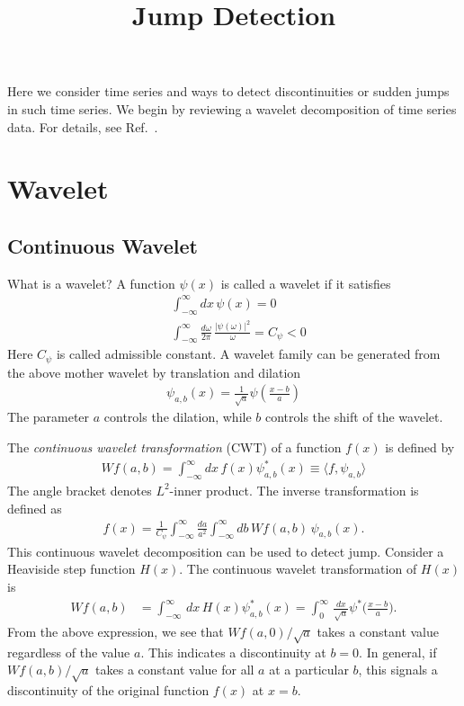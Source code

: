 \documentclass[11pt,a4paper]{article}
\begin{document}
\title{Jump Detection}
\maketitle

Here we consider time series and ways to detect discontinuities or sudden jumps in such time series. We begin by reviewing a wavelet decomposition of time series data. For details, see Ref.~\cite{1992tlw..conf.....D}.

\section{Wavelet}
\subsection{Continuous Wavelet}
What is a wavelet? A function $\psi(x)$ is called a wavelet if it satisfies
\begin{align}
&
\int_{-\infty}^{\infty} dx \, \psi(x)  = 0
\\
&
\int_{-\infty}^{\infty} \frac{d\omega}{2\pi} \, \frac{|\psi(\omega)|^2}{\omega} = C_\psi < 0
\end{align}
Here $C_\psi$ is called admissible constant. A wavelet family can be generated from the above mother wavelet by translation and dilation
\begin{align}
\psi_{a,b}(x) 
= \frac{1}{\sqrt{a}} \psi \left( \frac{x - b}{a} \right)
\end{align}
The parameter $a$ controls the dilation, while $b$ controls the shift of the wavelet. 

The {\it continuous wavelet transformation} (CWT) of a function $f(x)$ is defined by
\begin{align}
W f(a,b) = \int_{-\infty}^\infty dx \,  f(x) \psi^*_{a,b} (x)
\equiv \langle f, \psi_{a,b}  \rangle
\end{align}
The angle bracket denotes $L^2$-inner product. The inverse transformation is defined as
\begin{align}
f(x) 
= 
\frac{1}{C_\psi} 
\int_{-\infty}^\infty \frac{da}{a^2}
\int_{-\infty}^{\infty} db \, 
Wf(a,b) \, \psi_{a,b}(x).
\end{align}
This continuous wavelet decomposition can be used to detect jump. Consider a Heaviside step function $H(x)$. The continuous wavelet transformation of $H(x)$ is
\begin{align}
W f (a,b) 
&= \int_{-\infty}^{\infty} \, dx \, H(x) \psi^*_{a,b}(x)
= \int_{0}^{\infty} \, \frac{dx}{\sqrt{a}} \psi^*\Big( \frac{x-b}{a} \Big).
\end{align}
From the above expression, we see that $Wf(a,0) / \sqrt{a}$ takes a constant value regardless of the value $a$. This indicates a discontinuity at $b=0$. In general, if $Wf(a,b) / \sqrt{a}$ takes a constant value for all $a$ at a particular $b$, this signals a discontinuity of the original function $f(x)$ at $x=b$. 
\end{document}
